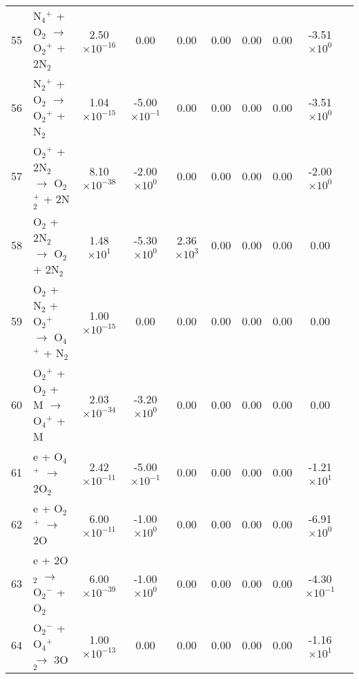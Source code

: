 \documentclass{article}
\begin{document}
\begin{table}[H]
{\begin{tabu}{clcccccccc}
      55 & N$_{4}$$^{+}$ + O$_{2}$ $\rightarrow$ O$_{2}$$^{+}$ + 2N$_{2}$ & 2.50$\times 10^{-16}$ & 0.00 & 0.00 & 0.00 & 0.00 & 0.00 & -3.51$\times 10^{0}$ & \cite{aleksandrov2009simulation} \\
      56 & N$_{2}$$^{+}$ + O$_{2}$ $\rightarrow$ O$_{2}$$^{+}$ + N$_{2}$ & 1.04$\times 10^{-15}$ & -5.00$\times 10^{-1}$ & 0.00 & 0.00 & 0.00 & 0.00 & -3.51$\times 10^{0}$ & \cite{aleksandrov2009simulation} \\
      57 & O$_{2}$$^{+}$ + 2N$_{2}$ $\rightarrow$ O$_{2}$$^{+}$ + 2N$_{2}$ & 8.10$\times 10^{-38}$ & -2.00$\times 10^{0}$ & 0.00 & 0.00 & 0.00 & 0.00 & -2.00$\times 10^{0}$ & \cite{aleksandrov2009simulation} \\
      58 & O$_{2}$ + 2N$_{2}$ $\rightarrow$ O$_{2}$ + 2N$_{2}$ & 1.48$\times 10^{1}$ & -5.30$\times 10^{0}$ & 2.36$\times 10^{3}$ & 0.00 & 0.00 & 0.00 & 0.00 & \cite{aleksandrov2009simulation} \\
      59 & O$_{2}$ + N$_{2}$ + O$_{2}$$^{+}$ $\rightarrow$ O$_{4}$$^{+}$ + N$_{2}$ & 1.00$\times 10^{-15}$ & 0.00 & 0.00 & 0.00 & 0.00 & 0.00 & 0.00 & \cite{aleksandrov2009simulation} \\
      60 & O$_{2}$$^{+}$ + O$_{2}$ + M $\rightarrow$ O$_{4}$$^{+}$ + M & 2.03$\times 10^{-34}$ & -3.20$\times 10^{0}$ & 0.00 & 0.00 & 0.00 & 0.00 & 0.00 & \cite{aleksandrov2009simulation} \\
      61 & e + O$_{4}$$^{+}$ $\rightarrow$ 2O$_{2}$ & 2.42$\times 10^{-11}$ & -5.00$\times 10^{-1}$ & 0.00 & 0.00 & 0.00 & 0.00 & -1.21$\times 10^{1}$ & \cite{aleksandrov2009simulation} \\
      62 & e + O$_{2}$$^{+}$ $\rightarrow$ 2O & 6.00$\times 10^{-11}$ & -1.00$\times 10^{0}$ & 0.00 & 0.00 & 0.00 & 0.00 & -6.91$\times 10^{0}$ & \cite{aleksandrov2009simulation} \\
      63 & e + 2O$_{2}$ $\rightarrow$ O$_{2}$$^{-}$ + O$_{2}$ & 6.00$\times 10^{-39}$ & -1.00$\times 10^{0}$ & 0.00 & 0.00 & 0.00 & 0.00 & -4.30$\times 10^{-1}$ & \cite{aleksandrov2009simulation} \\
      64 & O$_{2}$$^{-}$ + O$_{4}$$^{+}$ $\rightarrow$ 3O$_{2}$ & 1.00$\times 10^{-13}$ & 0.00 & 0.00 & 0.00 & 0.00 & 0.00 & -1.16$\times 10^{1}$ & \cite{aleksandrov2009simulation} \\
    \end{tabu}
  }
\end{table}
\end{document}
